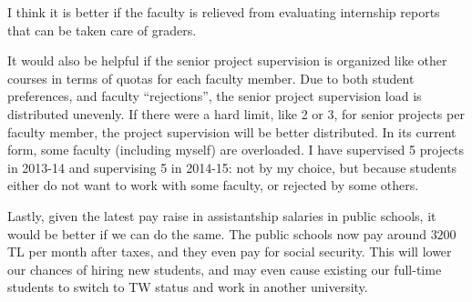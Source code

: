 

I think it is better if the faculty is relieved from evaluating internship reports that can be taken care of graders. 

It would also be helpful if the senior project supervision is organized like other courses in terms of quotas for each faculty member. Due to both student preferences, and faculty ``rejections'', the senior project supervision load is distributed unevenly. If there were a hard limit, like 2 or 3, for senior projects per faculty member, the project supervision will be better distributed. In its current form, some faculty (including myself) are overloaded. I have supervised 5 projects in 2013-14 and supervising 5 in 2014-15: not by my choice, but because students either do not want to work with some faculty, or rejected by some others. 

Lastly, given the latest pay raise in assistantship salaries in public schools, it would be better if we can do the same. The public schools now pay around $3200$ TL per month after taxes, and they even pay for social security. This will lower our chances of hiring new students, and may even cause existing our full-time students to switch to TW status and work in another university.
